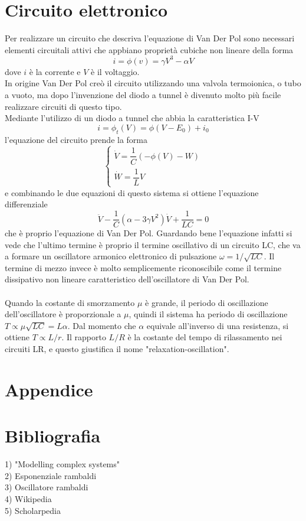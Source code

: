 \documentclass[12pt]{article}
\begin{document}
\section{Circuito elettronico}
Per realizzare un circuito che descriva l'equazione di Van Der Pol sono necessari elementi circuitali attivi che appbiano proprietà cubiche non lineare della forma
\begin{equation}
	i = \phi(v) = \gamma V^3 - \alpha V
\end{equation}
dove $i$ è la corrente e $V$ è il voltaggio. \\
In origine Van Der Pol creò il circuito utilizzando una valvola termoionica, o tubo a vuoto, ma dopo l'invenzione del diodo a tunnel è divenuto molto più facile realizzare circuiti di questo tipo. \\
Mediante l'utilizzo di un diodo a tunnel che abbia la caratteristica I-V
\begin{equation}
	i = \phi_t(V) = \phi(V - E_0) + i_0
\end{equation}
l'equazione del circuito prende la forma
\begin{equation}
	\begin{cases}
		\dot{V} = \dfrac{1}{C}\left(-\phi(V) - W\right) \\
		\dot{W} = \dfrac{1}{L}V
	\end{cases} 
\end{equation}
e combinando le due equazioni di questo sistema si ottiene l'equazione differenziale
\begin{equation}
	\ddot{V}-\frac{1}{C}\left( \alpha - 3\gamma  V^2\right)\dot{V} + \frac{1}{LC} = 0
\end{equation}
che è proprio l'equazione di Van Der Pol. Guardando bene l'equazione infatti si vede che l'ultimo termine è proprio il termine oscillativo di un circuito LC, che va a formare un oscillatore armonico elettronico di pulsazione $\omega = 1/\sqrt{LC}$. Il termine di mezzo invece è molto semplicemente riconoscibile come il termine dissipativo non lineare caratteristico dell'oscillatore di Van Der Pol. \\ \\
Quando la costante di smorzamento $\mu$ è grande, il periodo di oscillazione dell'oscillatore è proporzionale a $\mu$, quindi il sistema ha periodo di oscillazione $T \propto \mu\sqrt{LC} = L\alpha$. Dal momento che $\alpha$ equivale all'inverso di una resistenza, si ottiene $T \propto L/r$. Il rapporto $L/R$ è la costante del tempo di rilassamento nei circuiti LR, e questo giustifica il nome "relaxation-oscillation". 
\section{Appendice}
\section{Bibliografia}
1) "Modelling complex systems" \\
2) Esponenziale rambaldi \\
3) Oscillatore rambaldi \\
4) Wikipedia \\
5) Scholarpedia \\
\end{document}

